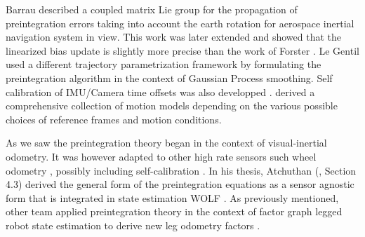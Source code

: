 Barrau \cite{barrau2020mathematical} described a coupled matrix Lie group for the propagation of preintegration errors taking into account the earth rotation for aerospace
inertial navigation system in view. This work was later extended \cite{brossard2021associating} and showed that the linearized bias update is slightly more precise than 
the work of Forster \cite{forster2017-TRO}. Le Gentil \cite{le2020gaussian} used a different trajectory parametrization framework by formulating the preintegration algorithm 
in the context of Gaussian Process smoothing. Self calibration of IMU/Camera time offsets was also developped \cite{yang2020analytic}. 
\cite{luo2021unified} derived a comprehensive collection of motion models depending on the various possible choices of reference frames and motion conditions. 

As we saw the preintegration theory began in the context of visual-inertial odometry. It was however adapted to other high rate sensors such wheel odometry \cite{quan2019tightly}, 
possibly including self-calibration \cite{deray-19-selfcalib}. In his thesis, Atchuthan (\cite{atchuthan-18-thesis}, Section 4.3) derived the general form of the preintegration 
equations as a sensor agnostic form that is integrated in state estimation WOLF \cite{sola2021wolf}. As previously mentioned, other team applied preintegration theory in the 
context of factor graph legged robot state estimation to derive new leg odometry factors \cite{hartley2018legged, wisth2019robust, wisth2020preintegrated}.


